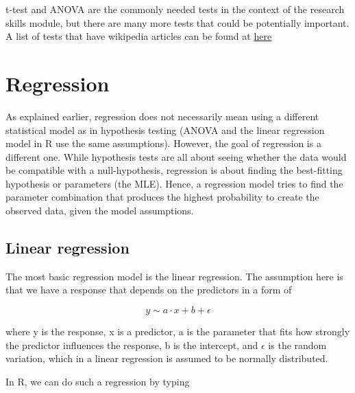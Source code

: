 \documentclass[a4paper,twoside]{tufte-book}\usepackage[]{graphicx}\usepackage[]{color}
\begin{document}
t-test and ANOVA are the commonly needed tests in the context of the research skills module, but there are many more tests that could be potentially important. A list of tests that have wikipedia articles can be found at \href{http://en.wikipedia.org/wiki/Category:Statistical_tests}{here} 


\section{Regression}

As explained earlier, regression does not necessarily mean using a different statistical model as in hypothesis testing (ANOVA and the linear regression model in R use the same assumptions). However, the goal of regression is a different one. While hypothesis tests are all about seeing whether the data would be compatible with a null-hypothesis, regression is about finding the best-fitting hypothesis or parameters (the MLE). Hence, a regression model tries to find the parameter combination that produces the highest probability to create the observed data, given the model assumptions.

\subsection{Linear regression}

The most basic regression model is the linear regression. The assumption here is that we have a response that depends on the predictors in a form of 

\begin{equation} \label{eq: linear regression}
y \sim a \cdot x + b + \epsilon 
\end{equation}

where y is the response, x is a predictor, a is the parameter that fits how strongly the predictor influences the response, b is the intercept, and $\epsilon$ is the random variation, which in a linear regression is assumed to be normally distributed. 

In R, we can do such a regression by typing
\end{document}
